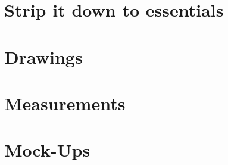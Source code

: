 \section{Strip it down to essentials}


\section{Drawings}


\section{Measurements}

\section{Mock-Ups}
